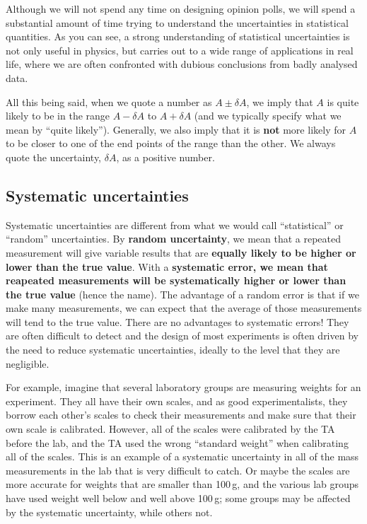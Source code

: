 Although we will not spend any time on designing opinion polls, we will spend a substantial amount of time trying to understand the uncertainties in statistical quantities. As you can see, a strong understanding of statistical uncertainties is not only useful in physics, but carries out to a wide range of applications in real life, where we are often confronted with dubious conclusions from badly analysed data.

All this being said, when we quote a number as $A\pm \delta A$, we imply that $A$ is quite likely to be in the range $A-\delta A$ to $A+\delta A$ (and we typically specify what we mean by ``quite likely''). Generally, we also imply that it is \textbf{not} more likely for $A$ to be closer to one of the end points of the range than the other. We always quote the uncertainty, $\delta A$, as a positive number. 

\subsection{Systematic uncertainties}

Systematic uncertainties are different from what we would call ``statistical'' or ``random'' uncertainties. By \textbf{random uncertainty}, we mean that a repeated measurement will give variable results that are \textbf{equally likely to be higher or lower than the true value}. With a \textbf{systematic error, we mean that reapeated measurements will be systematically higher or lower than the true value} (hence the name). The advantage of a random error is that if we make many measurements, we can expect that the average of those measurements will tend to the true value. There are no advantages to systematic errors! They are often difficult to detect and the design of most experiments is often driven by the need to reduce systematic uncertainties, ideally to the level that they are negligible.

For example, imagine that several laboratory groups are measuring weights for an experiment. They all have their own scales, and as good experimentalists, they borrow each other's scales to check their measurements and make sure that their own scale is calibrated. However, all of the scales were calibrated by the TA before the lab, and the TA used the wrong ``standard weight'' when calibrating all of the scales. This is an example of a systematic uncertainty in all of the mass measurements in the lab that is very difficult to catch. Or maybe the scales are more accurate for weights that are smaller than 100\,g, and the various lab groups have used weight well below and well above 100\,g; some groups may be affected by the systematic uncertainty, while others not. 

